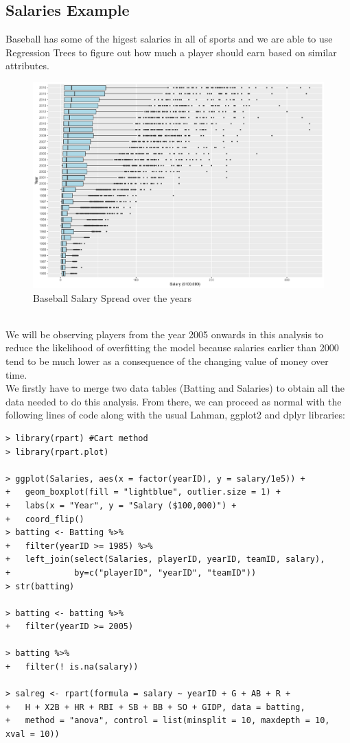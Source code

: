 \documentclass[11pt,a4paper]{report}
\begin{document}
\subsection{Salaries Example}
Baseball has some of the higest salaries in all of sports and we are able to use Regression Trees to figure out how much a player should earn based on similar attributes.
\begin{figure}
    \centering
    \includegraphics[width = 12cm]{photographs/Salaries.pdf}
    \caption{Baseball Salary Spread over the years}
    \label{fig:salaries}
\end{figure}\\
We will be observing players from the year 2005 onwards in this analysis to reduce the likelihood of overfitting the model because salaries earlier than 2000 tend to be much lower as a consequence of the changing value of money over time.\\
\medskip
We firstly have to merge two data tables (Batting and Salaries) to obtain all the data needed to do this analysis. From there, we can proceed as normal with the following lines of code along with the usual Lahman, ggplot2 and dplyr libraries:

\begin{lstlisting}[basicstyle=\scriptsize]
> library(rpart) #Cart method
> library(rpart.plot)

> ggplot(Salaries, aes(x = factor(yearID), y = salary/1e5)) +
+   geom_boxplot(fill = "lightblue", outlier.size = 1) +
+   labs(x = "Year", y = "Salary ($100,000)") +
+   coord_flip()
> batting <- Batting %>%
+   filter(yearID >= 1985) %>%
+   left_join(select(Salaries, playerID, yearID, teamID, salary), 
+             by=c("playerID", "yearID", "teamID"))
> str(batting)

> batting <- batting %>%
+   filter(yearID >= 2005)

> batting %>%
+   filter(! is.na(salary))

> salreg <- rpart(formula = salary ~ yearID + G + AB + R + 
+   H + X2B + HR + RBI + SB + BB + SO + GIDP, data = batting, 
+   method = "anova", control = list(minsplit = 10, maxdepth = 10, xval = 10))
\end{lstlisting}
\end{document}
